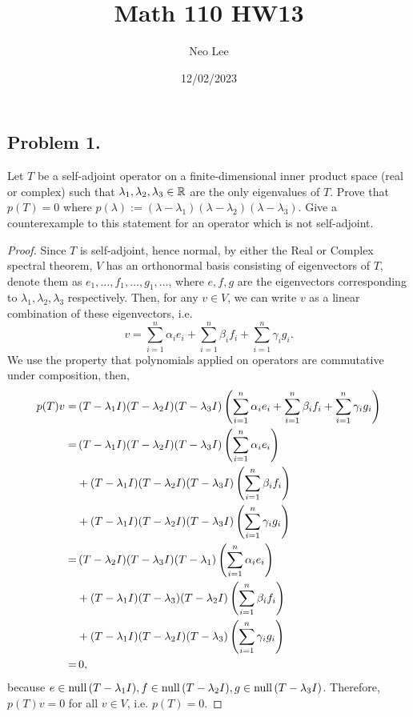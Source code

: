 \documentclass{article}
\title{Math 110 HW13}
\author{Neo Lee}
\date{12/02/2023}
\begin{document}
 
\maketitle 

\subsection*{Problem 1.}
Let $T$ be a self-adjoint operator on a finite-dimensional inner product space (real or complex) such that $\lambda_1, \lambda_2, \lambda_3 \in \mathbb{R}$ are the only eigenvalues of $T$. Prove that
$p(T)=0$ where $p(\lambda):= (\lambda - \lambda_1)(\lambda - \lambda_2)(\lambda - \lambda_3)$.
Give a counterexample to this statement for an operator which is not self-adjoint.
\begin{proof}
    Since $T$ is self-adjoint, hence normal, by either the Real or Complex spectral theorem, 
    $V$ has an orthonormal basis consisting of eigenvectors of $T$, denote them as $e_1,\dots, f_1,
    \dots, g_1,\dots$, where $e, f, g$ are the eigenvectors corresponding to $\lambda_1, \lambda_2,
    \lambda_3$ respectively. Then, for any $v\in V$, we can write $v$ as a linear combination of
    these eigenvectors, i.e. 
    \[
        v = \sum_{i=1}^n \alpha_i e_i + \sum_{i=1}^n \beta_i f_i + \sum_{i=1}^n \gamma_i g_i.  
    \] 
    We use the property that polynomials applied on operators are commutative under composition,
    then, 
    \begin{align*}
        p(T)v = &\, (T-\lambda_1 I)(T-\lambda_2 I)(T-\lambda_3 I)
        \left(\sum_{i=1}^n \alpha_i e_i + \sum_{i=1}^n \beta_i f_i + \sum_{i=1}^n \gamma_i g_i\right) \\
        = &\, (T-\lambda_1 I)(T-\lambda_2 I)(T-\lambda_3 I)\left(\sum_{i=1}^n \alpha_i e_i\right) \\
        & + (T-\lambda_1 I)(T-\lambda_2 I)(T-\lambda_3 I)\left(\sum_{i=1}^n \beta_i f_i\right) \\
        & + (T-\lambda_1 I)(T-\lambda_2 I)(T-\lambda_3 I)\left(\sum_{i=1}^n \gamma_i g_i\right) \\
        = &\, (T-\lambda_2 I)(T-\lambda_3 I)(T-\lambda_1)\left(\sum_{i=1}^n \alpha_i e_i\right) \\
        & + (T-\lambda_1 I)(T-\lambda_3)(T-\lambda_2 I)\left(\sum_{i=1}^n \beta_i f_i\right) \\
        & + (T-\lambda_1 I)(T-\lambda_2 I)(T-\lambda_3)\left(\sum_{i=1}^n \gamma_i g_i\right) \\
        = &\, 0,
    \end{align*}
    because $e\in \mathrm{null}\,(T-\lambda_1 I), f\in \mathrm{null}\,(T-\lambda_2 I), g\in \mathrm{null}\,(T-\lambda_3 I)$.
    Therefore, $p(T)v = 0$ for all $v\in V$, i.e. $p(T) = 0$. 
    

\end{proof}
\end{document}

